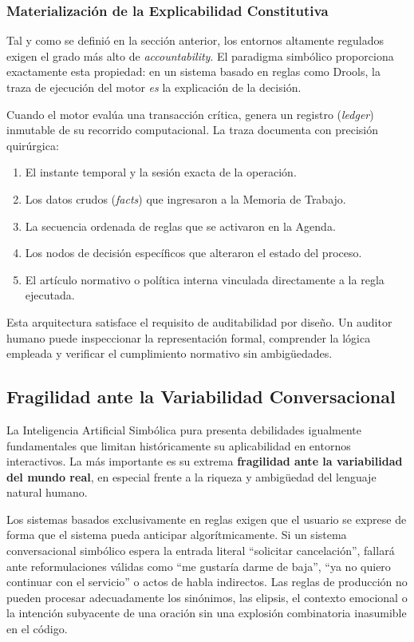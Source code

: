 \documentclass[12pt,a4paper]{report}
\begin{document}
\subsubsection{Materialización de la Explicabilidad Constitutiva}

Tal y como se definió en la sección anterior, los entornos altamente regulados exigen el grado más alto de \textit{accountability}. El paradigma simbólico proporciona exactamente esta propiedad: en un sistema basado en reglas como Drools, la traza de ejecución del motor \textit{es} la explicación de la decisión. 

Cuando el motor evalúa una transacción crítica, genera un registro (\textit{ledger}) inmutable de su recorrido computacional. La traza documenta con precisión quirúrgica:
\begin{enumerate}
    \item El instante temporal y la sesión exacta de la operación.
    \item Los datos crudos (\textit{facts}) que ingresaron a la Memoria de Trabajo.
    \item La secuencia ordenada de reglas que se activaron en la Agenda.
    \item Los nodos de decisión específicos que alteraron el estado del proceso.
    \item El artículo normativo o política interna vinculada directamente a la regla ejecutada.
\end{enumerate}

Esta arquitectura satisface el requisito de auditabilidad por diseño. Un auditor humano puede inspeccionar la representación formal, comprender la lógica empleada y verificar el cumplimiento normativo sin ambigüedades. 

\subsection{Fragilidad ante la Variabilidad Conversacional}

La Inteligencia Artificial Simbólica pura presenta debilidades igualmente fundamentales que limitan históricamente su aplicabilidad en entornos interactivos. La más importante es su extrema \textbf{fragilidad ante la variabilidad del mundo real}, en especial frente a la riqueza y ambigüedad del lenguaje natural humano.

Los sistemas basados exclusivamente en reglas exigen que el usuario se exprese de forma que el sistema pueda anticipar algorítmicamente. Si un sistema conversacional simbólico espera la entrada literal ``solicitar cancelación'', fallará ante reformulaciones válidas como ``me gustaría darme de baja'', ``ya no quiero continuar con el servicio'' o actos de habla indirectos. Las reglas de producción no pueden procesar adecuadamente los sinónimos, las elipsis, el contexto emocional o la intención subyacente de una oración sin una explosión combinatoria inasumible en el código.
\end{document}
